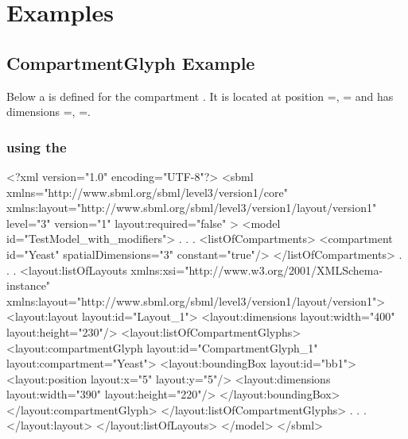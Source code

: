 \section{Examples}
\label{examples}
\subsection{CompartmentGlyph Example}
Below a \CompartmentGlyph is defined for the compartment . 
It is located at position =, = and
has dimensions =, =. 

\label{example:compartmentglyph}
\subsubsection{\sbmlthreecore using the \LayoutPackage}
\begin{example}
<?xml version="1.0" encoding="UTF-8"?>
<sbml xmlns="http://www.sbml.org/sbml/level3/version1/core" 
		xmlns:layout="http://www.sbml.org/sbml/level3/version1/layout/version1" 
		level="3" version="1" layout:required="false" >		
  <model id="TestModel_with_modifiers">
                .
                .
                .
    <listOfCompartments>
      <compartment id="Yeast" spatialDimensions="3" constant="true"/>
    </listOfCompartments>	
                .
                .
                .
    <layout:listOfLayouts xmlns:xsi="http://www.w3.org/2001/XMLSchema-instance" 
		xmlns:layout="http://www.sbml.org/sbml/level3/version1/layout/version1">
      <layout:layout layout:id="Layout_1">
        <layout:dimensions layout:width="400" layout:height="230"/>
        <layout:listOfCompartmentGlyphs>
          <layout:compartmentGlyph layout:id="CompartmentGlyph_1" layout:compartment="Yeast">
            <layout:boundingBox layout:id="bb1">
              <layout:position layout:x="5" layout:y="5"/>
              <layout:dimensions layout:width="390" layout:height="220"/>
            </layout:boundingBox>
          </layout:compartmentGlyph>
        </layout:listOfCompartmentGlyphs>
                .
                .
                .
			</layout:layout>
		</layout:listOfLayouts>
  </model>
</sbml>
\end{example}
